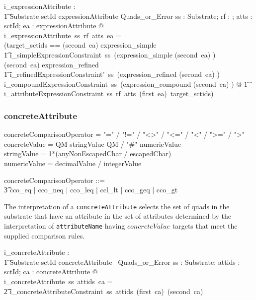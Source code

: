 \documentclass{article}
\def\spec#1{{\tt #1}}
\def\bnf#1{{\scriptsize {{#1}} }}
\begin{document}
\begin{gendef}
   i\_expressionAttribute : \\
\t1 Substrate \fun \optional[reverseFlag] \fun \power sctId \fun expressionAttribute \fun Quads\_or\_Error
\where
   \forall ss : Substrate; rf : \optional[reverseFlag]; atts : \power sctId; ea : expressionAttribute @ \\
   i\_expressionAttribute~ss~rf~atts~ea = \\
   (\LET target\_sctids == 
   \IF (second~ea) \in \ran expression\_simple \\
\t1 \THEN i\_simpleExpressionConstraint~ss~(expression\_simple \inv (second~ea) ) \\
\ELSE \IF (second~ea)  \in \ran expression\_refined \\
\t1 \THEN i\_refinedExpressionConstraint'~ss~(expression\_refined \inv (second~ea) ) \\
\ELSE i\_compoundExpressionConstraint~ss~(expression\_compound \inv (second~ea) ) @ 
\also
\t1 i\_attributeExpressionConstraint~ss~rf~atts~(first~ea)~target\_sctids)
\end{gendef}



\subsubsection{concreteAttribute}
\begin{framed}
\noindent
\bnf{concreteComparisonOperator = "=" / "!=" /  "\textless\textgreater" / "\textless=" / "\textless" / "\textgreater=" / "\textgreater"} \\
\bnf{concreteValue =  QM stringValue QM / "\#" numericValue} \\
\bnf{stringValue = 1*(anyNonEscapedChar / escapedChar)} \\
\bnf{numericValue = decimalValue / integerValue}
\end{framed}
\begin{zed}
concreteComparisonOperator ::= \\
\t3 cco\_eq | cco\_neq | cco\_leq | ccl\_lt | cco\_geq | cco\_gt 
\end{zed}


The interpretation of a \spec{concreteAttribute} selects the set of quads in the substrate that have an attribute in the set of attributes 
determined by the interpretation of \spec{attributeName} having $concreteValue$ targets that meet the supplied comparison rules.

\begin{gendef}
   i\_concreteAttribute : \\
\t1 Substrate \fun \power sctId \fun concreteAttribute \fun \ Quads\_or\_Error
\where
   \forall ss : Substrate; attids : \power sctId; ca : concreteAttribute @ \\
   i\_concreteAttribute~ss~attids~ca = \\
\t2 i\_concreteAttributeConstraint~ss~attids~(first~ca)~(second~ca)
\end{gendef}
   
\end{document}
